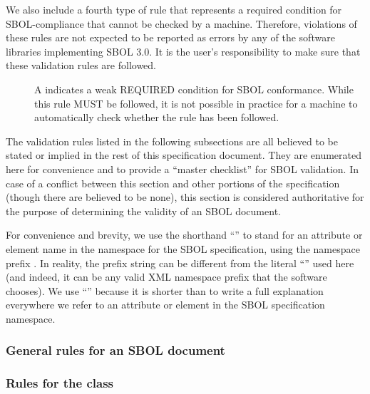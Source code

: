 We also include a fourth type of rule that represents a required condition for SBOL-compliance that cannot be checked by a machine. Therefore, violations of these rules are not expected to be reported as errors by any of the software libraries implementing SBOL 3.0. It is the user's responsibility to make sure that these validation rules are followed.

\begin{description}
\item[\hspace*{6.5pt}\cSymbol\csp] A \cSymbolName indicates a weak REQUIRED condition for SBOL conformance. While this rule MUST be followed, it is not possible in practice for a machine to automatically check whether the rule has been followed.
\end{description}


The validation rules listed in the following subsections are all believed to be
stated or implied in the rest of this specification document.  They
are enumerated here for convenience and to provide a ``master
checklist'' for SBOL validation.  In case of a conflict between this
section and other portions of the specification (though there are believed to
be none), this section is considered authoritative for the purpose of
determining the validity of an SBOL document.

For \notice convenience and brevity, we use the shorthand
``'' to stand for an attribute or element name 
in the namespace for the SBOL specification, using
the namespace prefix .  In reality, the prefix string can be different from the literal ``'' used here (and indeed, it can be any valid XML namespace prefix that the software
chooses).  We use ``'' because it is shorter than to
write a full explanation everywhere we refer to an attribute or element
in the SBOL specification namespace.

\subsubsection*{General rules for an SBOL document}
\setcounter{sbolCtr}{10101} 

\subsubsection*{Rules for the  class} 
\setcounter{sbolCtr}{10201}

